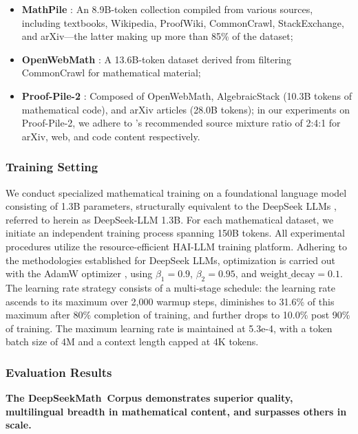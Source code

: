\begin{itemize}[topsep=0pt]
    \item \textbf{MathPile} \citep{mathpile}: An 8.9B-token collection compiled from various sources, including textbooks, Wikipedia, ProofWiki, CommonCrawl, StackExchange, and arXiv—the latter making up more than 85\% of the dataset;
    \item \textbf{OpenWebMath} \citep{openwebmath}: A 13.6B-token dataset derived from filtering CommonCrawl for mathematical material;
    \item \textbf{Proof-Pile-2} \citep{llemma}: Composed of OpenWebMath, AlgebraicStack (10.3B tokens of mathematical code), and arXiv articles (28.0B tokens); in our experiments on Proof-Pile-2, we adhere to \cite{llemma}'s recommended source mixture ratio of 2:4:1 for arXiv, web, and code content respectively.
\end{itemize}

\subsubsection{Training Setting}
\label{sec:quality-policy}
We conduct specialized mathematical training on a foundational language model consisting of 1.3B parameters, structurally equivalent to the DeepSeek LLMs \citep{deepseek-llm}, referred to herein as DeepSeek-LLM 1.3B. For each mathematical dataset, we initiate an independent training process spanning 150B tokens. All experimental procedures utilize the resource-efficient HAI-LLM \citep{haillm} training platform. Adhering to the methodologies established for DeepSeek LLMs, optimization is carried out with the AdamW optimizer \citep{adamW}, using $\beta_1=0.9$, $\beta_2=0.95$, and $\mathrm{weight\_decay}=0.1$. The learning rate strategy consists of a multi-stage schedule: the learning rate ascends to its maximum over 2,000 warmup steps, diminishes to 31.6\% of this maximum after 80\% completion of training, and further drops to 10.0\% post 90\% of training. The maximum learning rate is maintained at 5.3e-4, with a token batch size of 4M and a context length capped at 4K tokens.

\subsubsection{Evaluation Results}

\textbf{The DeepSeekMath~Corpus demonstrates superior quality, multilingual breadth in mathematical content, and surpasses others in scale.}

